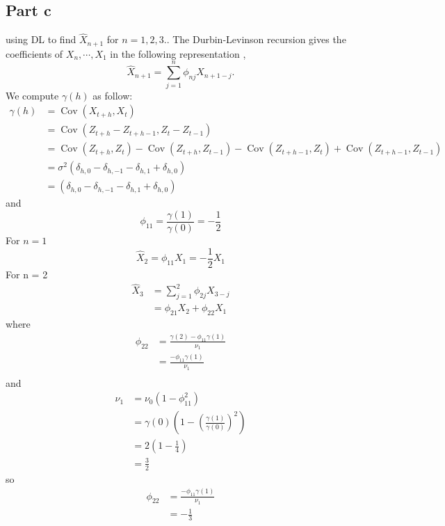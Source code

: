 \documentclass[11pt, oneside]{article}   	%
\newcommand{\Cov}{\operatorname{Cov}}
\begin{document}
\subsection{Part c}
 using DL to find $\widehat{X}_{n+1}$ for $n = 1,2,3.$. The Durbin-Levinson recursion gives the coefficients of $X_{n}, \cdots, X_{1}$ in the following representation \cite{petter},
 \begin{equation}
 \widehat{X}_{n+1} = \sum_{j=1}^{n}\phi_{nj}X_{n+1-j}.
 \end{equation}
 We compute $\gamma(h)$ as follow:
 \begin{equation}
\begin{split}
\gamma(h) &= \Cov(X_{t+h}, X_{t})\\
&= \Cov(Z_{t+h} - Z_{t+h-1}, Z_{t} - Z_{t-1})\\
&=\Cov(Z_{t+h},Z_{t})-\Cov(Z_{t+h},Z_{t-1})-\Cov(Z_{t+h-1},Z_{t})+\Cov(Z_{t+h-1},Z_{t-1})\\
&=\sigma^{2}(\delta_{h,0}-\delta_{h,-1}-\delta_{h,1}+\delta_{h,0})\\
&=(\delta_{h,0}-\delta_{h,-1}-\delta_{h,1}+\delta_{h,0})
\end{split}
 \end{equation}
 and 
 \begin{equation}
 \phi_{11} = \frac{\gamma(1)}{\gamma(0)} = -\frac{1}{2}
 \end{equation}
 For $n=1$
 \begin{equation}
 \widehat{X}_{2} = \phi_{11}X_{1} = -\frac{1}{2}X_{1}
 \end{equation}
 For n = 2
 \begin{equation}
 \begin{split}
 \widehat{X}_{3} &= \sum_{j=1}^{2}\phi_{2j}X_{3-j}\\
 &=\phi_{21}X_{2} + \phi_{22}X_{1}
 \end{split}
 \end{equation}
 where 
 \begin{equation}
 \begin{split}
 \phi_{22} &= \frac{\gamma(2)-\phi_{11}\gamma(1)}{\nu_{1}}\\
 &=\frac{-\phi_{11}\gamma(1)}{\nu_{1}}\\
 \end{split}
 \end{equation}
 and 
 \begin{equation}
 \begin{split}
 \nu_{1} &= \nu_{0}(1-\phi_{11}^{2})\\
 &=\gamma(0)\left(1-\left(\frac{\gamma(1)}{\gamma(0)}\right)^{2}\right)\\
 &=2\left(1-\frac{1}{4}\right)\\
 &= \frac{3}{2}
 \end{split}
 \end{equation}
 so 
 \begin{equation}
 \begin{split}
 \phi_{22} &=\frac{-\phi_{11}\gamma(1)}{\nu_{1}}\\
 &= -\frac{1}{3}
 \end{split}
 \end{equation}
 
\end{document}
